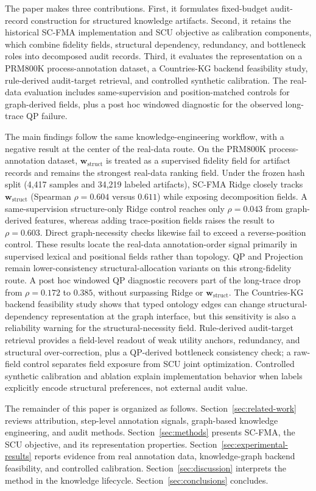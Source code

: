 \documentclass[pdflatex,sn-mathphys-num,iicol]{sn-jnl}
\newcommand{\wstruct}{\ensuremath{\mathbf{w}_{\mathrm{struct}}}}
\begin{document}
The paper makes three contributions. First, it formulates fixed-budget audit-record construction for structured knowledge artifacts. Second, it retains the historical SC-FMA implementation and SCU objective as calibration components, which combine fidelity fields, structural dependency, redundancy, and bottleneck roles into decomposed audit records. Third, it evaluates the representation on a PRM800K process-annotation dataset, a Countries-KG backend feasibility study, rule-derived audit-target retrieval, and controlled synthetic calibration. The real-data evaluation includes same-supervision and position-matched controls for graph-derived fields, plus a post hoc windowed diagnostic for the observed long-trace QP failure.

The main findings follow the same knowledge-engineering workflow, with a negative result at the center of the real-data route. On the PRM800K process-annotation dataset, \wstruct{} is treated as a supervised fidelity field for artifact records and remains the strongest real-data ranking field. Under the frozen hash split (4,417 samples and 34,219 labeled artifacts), SC-FMA Ridge closely tracks \wstruct{} (Spearman $\rho = 0.604$ versus $0.611$) while exposing decomposition fields. A same-supervision structure-only Ridge control reaches only $\rho=0.043$ from graph-derived features, whereas adding trace-position fields raises the result to $\rho=0.603$. Direct graph-necessity checks likewise fail to exceed a reverse-position control. These results locate the real-data annotation-order signal primarily in supervised lexical and positional fields rather than topology. QP and Projection remain lower-consistency structural-allocation variants on this strong-fidelity route. A post hoc windowed QP diagnostic recovers part of the long-trace drop from $\rho=0.172$ to $0.385$, without surpassing Ridge or \wstruct{}. The Countries-KG backend feasibility study shows that typed ontology edges can change structural-dependency representation at the graph interface, but this sensitivity is also a reliability warning for the structural-necessity field. Rule-derived audit-target retrieval provides a field-level readout of weak utility anchors, redundancy, and structural over-correction, plus a QP-derived bottleneck consistency check; a raw-field control separates field exposure from SCU joint optimization. Controlled synthetic calibration and ablation explain implementation behavior when labels explicitly encode structural preferences, not external audit value.

The remainder of this paper is organized as follows. Section~\ref{sec:related-work} reviews attribution, step-level annotation signals, graph-based knowledge engineering, and audit methods. Section~\ref{sec:methods} presents SC-FMA, the SCU objective, and its representation properties. Section~\ref{sec:experimental-results} reports evidence from real annotation data, knowledge-graph backend feasibility, and controlled calibration. Section~\ref{sec:discussion} interprets the method in the knowledge lifecycle. Section~\ref{sec:conclusions} concludes.
\end{document}
